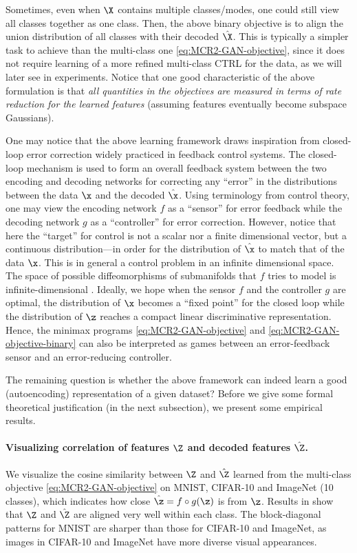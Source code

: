 \documentclass[../../book-main.tex]{subfiles}
\begin{document}
Sometimes, even when $\X$ contains multiple classes/modes, one could
still view all classes together as one class. Then, the above binary
objective is to align the union distribution of all classes with
their decoded $\hat \X$. This is typically a simpler task to achieve
than the multi-class one \eqref{eq:MCR2-GAN-objective}, since it does
not require learning of a more refined multi-class CTRL for the data,
as we will later see in experiments. Notice that one good
characteristic of the above formulation is that {\em all quantities
    in the objectives are measured in terms of rate reduction for the
learned features} (assuming features eventually become subspace Gaussians).

One may notice that the above learning framework draws inspiration
from closed-loop error correction widely practiced in feedback
control systems. The closed-loop mechanism is used to form an overall
feedback system between the two encoding and decoding networks for
correcting any ``error'' in the distributions between the data $\x$
and the decoded $\hat \x$. Using terminology from control theory, one
may view the encoding network $f$ as a ``sensor'' for error feedback
while the decoding network $g$ as a ``controller'' for error
correction. However, notice that here the ``target'' for control is
not a scalar nor a finite dimensional vector, but a continuous
distribution---in order for the distribution of $\hat \x$ to match
that of the data $\x$. This is in general a control problem in an
infinite dimensional space. The space of possible diffeomorphisms of
submanifolds that $f$ tries to model is infinite-dimensional
\cite{Lee2002IntroductionTS}. Ideally, we hope when the sensor $f$
and the controller $g$ are optimal, the distribution of $\x$ becomes
a ``fixed point'' for the closed loop while the distribution of $\z$
reaches a compact linear discriminative representation. Hence, the
minimax programs \eqref{eq:MCR2-GAN-objective} and
\eqref{eq:MCR2-GAN-objective-binary} can also be interpreted as games
between an error-feedback sensor and an error-reducing controller.

The remaining question is whether the above framework can indeed
learn a good (autoencoding) representation of a given dataset? Before
we give some formal theoretical justification (in the next
subsection), we present some empirical results.

\paragraph{Visualizing correlation of features $\Z$ and decoded
features $\hat \Z$.} We visualize the cosine similarity between $\Z$
and $\hat{\Z}$ learned from the multi-class objective
\eqref{eq:MCR2-GAN-objective} on MNIST, CIFAR-10 and ImageNet (10
classes), which indicates how close $\hat{\z} = f\circ g(\z)$ is from
$\z$. Results in  show that $\Z$ and $\hat{\Z}$
are aligned very well within each class. The block-diagonal patterns
for MNIST are sharper than those for CIFAR-10 and ImageNet, as images
in CIFAR-10 and ImageNet have more diverse visual appearances.
\end{document}
